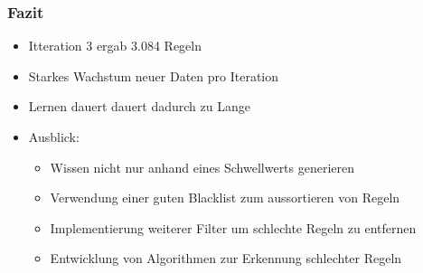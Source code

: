 \begin{frame}
  \frametitle{Fazit}

  \begin{itemize}
  \item Itteration 3 ergab 3.084 Regeln
  \item Starkes Wachstum neuer Daten pro Iteration
  \item Lernen dauert dauert dadurch zu Lange
  \item Ausblick:
    \begin{itemize}
    \item Wissen nicht nur anhand eines Schwellwerts generieren
    \item Verwendung einer guten Blacklist zum aussortieren von Regeln
    \item Implementierung weiterer Filter um schlechte Regeln zu entfernen
    \item Entwicklung von Algorithmen zur Erkennung schlechter Regeln
    \end{itemize}
  \end{itemize}
\end{frame}
